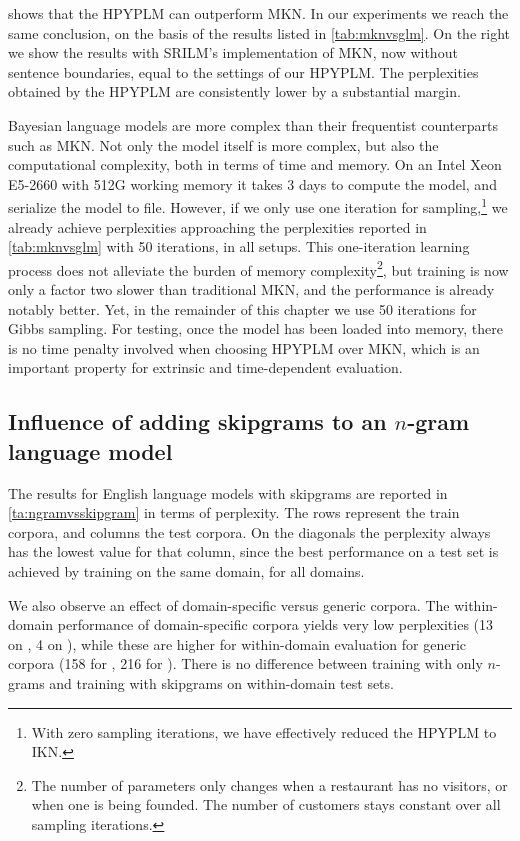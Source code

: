 \autocite{teh2006hierarchical} shows that the HPYPLM can outperform MKN. In our experiments we reach the same conclusion, on the basis of the results listed in \cref{tab:mknvsglm}. On the right we show the results with SRILM's implementation of MKN, now without sentence boundaries, equal to the settings of our HPYPLM. The perplexities obtained by the HPYPLM are consistently lower by a substantial margin.

Bayesian language models are more complex than their frequentist counterparts such as MKN. Not only the model itself is more complex, but also the computational complexity, both in terms of time and memory. On an Intel Xeon E5-2660 with 512G working memory it takes 3 days to compute the \obw model, and serialize the model to file. However, if we only use one iteration for sampling,\footnote{With zero sampling iterations, we have effectively reduced the HPYPLM to IKN.} we already achieve perplexities approaching the perplexities reported in \cref{tab:mknvsglm} with 50 iterations, in all setups. This one-iteration learning process does not alleviate the burden of memory complexity\footnote{The number of parameters only changes when a restaurant has no visitors, or when one is being founded. The number of customers stays constant over all sampling iterations.}, but training is now only a factor two slower than traditional MKN, and the performance is already notably better.
Yet, in the remainder of this chapter we use 50 iterations for Gibbs sampling. For testing, once the model has been loaded into memory, there is no time penalty involved when choosing HPYPLM over MKN, which is an important property for extrinsic and time-dependent evaluation.

\subsection{Influence of adding skipgrams to an $n$-gram language model}
The results for English language models with skipgrams are reported in \cref{ta:ngramvsskipgram} in terms of perplexity. The rows represent the train corpora, and columns the test corpora. On the diagonals the perplexity always has the lowest value for that column, since the best performance on a test set is achieved by training on the same domain, for all domains. 

We also observe an effect of domain-specific versus generic corpora. The within-domain performance of domain-specific corpora yields very low perplexities (13 on \jrc, 4 on \emea), while these are higher for within-domain evaluation for generic corpora (158 for \obw, 216 for \wp). There is no difference between training with only $n$-grams and training with skipgrams on within-domain test sets.

